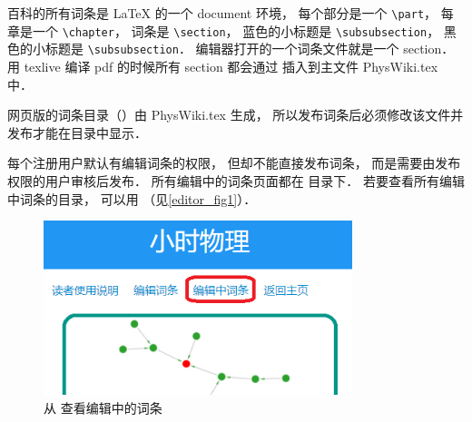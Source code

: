 百科的所有词条是 LaTeX 的一个 document 环境， 每个部分是一个 \lstinline|\part|， 每章是一个 \lstinline|\chapter|， 词条是 \lstinline|\section|， 蓝色的小标题是 \lstinline|\subsubsection|， 黑色的小标题是 \lstinline|\subsubsection|． 编辑器打开的一个词条文件就是一个 section． 用 texlive 编译 pdf 的时候所有 section 都会通过 \lstinline|| 插入到主文件 PhysWiki.tex 中．

网页版的词条目录（）由 PhysWiki.tex 生成， 所以发布词条后必须修改该文件并发布才能在目录中显示．

每个注册用户默认有编辑词条的权限， 但却不能直接发布词条， 而是需要由发布权限的用户审核后发布． 所有编辑中的词条页面都在  目录下． 若要查看所有编辑中词条的目录， 可以用 （见\autoref{editor_fig1}）．

\begin{figure}[ht]
\centering
\includegraphics[width=9cm]{./figures/editor1.png}
\caption{从  查看编辑中的词条} \label{editor_fig1}
\end{figure}

